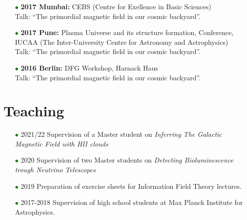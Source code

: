 \documentclass[11pt,a4paper,sans, table, dvipsnames]{moderncv}        %
\begin{document}
\begin{itemize}
\item[\textcolor{Green}{$\bullet$}]{\textbf{2017 Mumbai:} CEBS (Centre for Exellence in Basic
Sciences) \\ Talk: ``The primordial magnetic field in our cosmic backyard''.}

\item[\textcolor{Green}{$\bullet$}]{\textbf{2017 Pune:} Plasma Universe and its structure formation, Conference, IUCAA (The Inter-University Centre for Astronomy and Astrophysics)\\ Talk: ``The primordial magnetic field in our cosmic backyard''.}

\item[\textcolor{Green}{$\bullet$}]{\textbf{2016 Berlin:} DFG Workshop, Harnack Haus\\ Talk: ``The primordial magnetic field in our cosmic backyard''.}
\end{itemize}

\vspace{\baselineskip}
\section{Teaching}
\begin{itemize}
\item[\textcolor{Green}{$\bullet$}] 2021/22 Supervision of a Master student
on  \textit{Inferring The Galactic Magnetic Field with HII clouds}
\vspace{5pt}

\item[\textcolor{Green}{$\bullet$}] 2020 Supervision of two Master students on 
\textit{Detecting Bioluminescence trough Neutrino Telescopes}

\vspace{5pt}

\item[\textcolor{Green}{$\bullet$}] 2019 Preparation of exercise sheets for Information Field Theory lectures.

\vspace{5pt}

\item[\textcolor{Green}{$\bullet$}] 2017-2018 Supervision of high school students at Max Planck Institute for Astrophysics.
\end{itemize}



\end{document}
